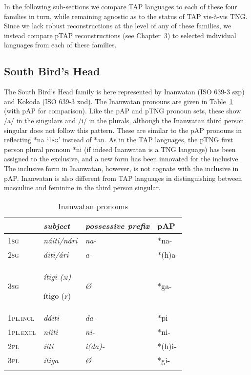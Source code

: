 In the following sub-sections we compare TAP languages to each of these four families in turn, while remaining agnostic as to the status of TAP vis-\`a-vis TNG. Since we lack robust reconstructions at the level of any of these families, we instead compare pTAP reconstructions (see Chapter~3) to selected individual languages from each of these families.

\subsection{South Bird's Head}
The South Bird's Head family is here represented by Inanwatan (ISO 639-3 szp) and Kokoda (ISO 639-3 xod). The Inanwatan pronouns are given in Table~\ref{tab:4:12} (with pAP for comparison). Like the pAP and pTNG pronoun sets, these show /a/ in the singulars and /i/ in the plurals, although the Inanwatan third person singular does not follow this pattern. These are similar to the pAP pronouns in reflecting *na `\textsc{1sg}' instead of *an. As in the TAP languages, the pTNG first person plural pronoun *ni (if indeed Inanwatan is a TNG language) has been assigned to the exclusive, and a new form has been innovated for the inclusive. The inclusive form in Inanwatan, however, is not cognate with the inclusive in pAP. Inanwatan is also different from TAP languages in distinguishing between masculine and feminine in the third person singular.


\begin{table}[h]
\caption{Inanwatan pronouns \citep[27-29]{DeVries2004}}
\label{tab:4:12}

\begin{tabularx}{\textwidth}{X>{\it}X>{\it}lX}
\lsptoprule
 &\rm subject&\rm possessive prefix&\rm pAP\\
 \midrule  
\textsc{1sg}&n\'aiti/n\'ari&na-&*na-\\ 
\textsc{2sg}&\'aiti/\'ari&a-&*(h)a-\\ 
\textsc{3sg}&\'itigi (\textsc{m})

\'itigo (\textsc{f})&{\O}&*ga-\\
\textsc{1pl.incl}&d\'aiti&da-&*pi-\\ 
\textsc{1pl.excl}&n\'iiti&ni-&*ni-\\ 
\textsc{2pl}&\'iiti&i(da)-&*(h)i-\\ 
\textsc{3pl}&\'itiga&{\O}&*gi-\\ 
\lspbottomrule
\end{tabularx}
\end{table}

